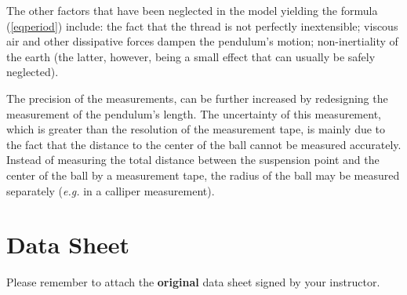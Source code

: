 \documentclass{article}
\begin{document}
The other factors that have been neglected in the model yielding the formula (\ref{eqperiod}) include: the fact that the thread is not perfectly inextensible; viscous air and other dissipative forces dampen the pendulum's motion; non-inertiality of the earth (the latter, however, being a small effect that can usually be safely neglected).

The precision of the measurements, can be further increased by redesigning the measurement of the pendulum's length.  The uncertainty of this measurement, which is greater than the resolution of the measurement tape, is mainly due to the fact that the distance to the center of the ball cannot be measured accurately. Instead of measuring the total  distance between the suspension point and the center of the ball by a measurement tape, the radius of the ball may be measured separately (\textit{e.g.} in a calliper measurement).

\section*{Data Sheet}

{\color{blue}Please remember to attach the \textbf{original} data sheet signed by your instructor.}
\end{document}
